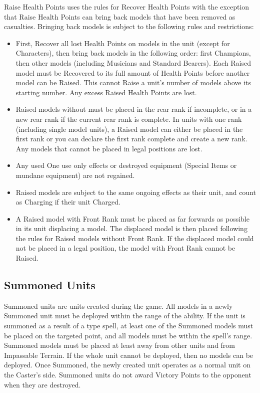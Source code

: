 Raise Health Points uses the rules for Recover Health Points with the exception that Raise Health Points can bring back models that have been removed as casualties. Bringing back models is subject to the following rules and restrictions:
\begin{itemize}
	\item First, Recover all lost Health Points on models in the unit (except for Characters), then bring back models in the following order: first Champions, then other \rnf{} models (including Musicians and Standard Bearers). Each Raised model must be Recovered to its full amount of Health Points before another model can be Raised. This cannot Raise a unit's number of models above its starting number. Any excess Raised Health Points are lost.
	\item Raised models without \frontrank{} must be placed in the rear rank if incomplete, or in a new rear rank if the current rear rank is complete. In units with one rank (including single model units), a Raised model can either be placed in the first rank or you can declare the first rank complete and create a new rank. Any models that cannot be placed in legal positions are lost.
	\item Any used One use only effects or destroyed equipment (Special Items or mundane equipment) are not regained.
	\item Raised models are subject to the same ongoing effects as their unit, and count as Charging if their unit Charged.
	\item A Raised model with Front Rank must be placed as far forwards as possible in its unit displacing a \rnf{} model. The displaced \rnf{} model is then placed following the rules for Raised models without Front Rank. If the displaced model could not be placed in a legal position, the model with Front Rank cannot be Raised.
\end{itemize}

\columnbreak

\subsection{Summoned Units}
\label{summoned_units}

Summoned units are units created during the game. All models in a newly Summoned unit must be deployed within the range of the ability. If the unit is summoned as a result of a \ground{} type spell, at least one of the Summoned models must be placed on the targeted point, and all models must be within the spell's range. Summoned models must be placed at least  away from other units and from Impassable Terrain. If the whole unit cannot be deployed, then no models can be deployed. Once Summoned, the newly created unit operates as a normal unit on the Caster's side. Summoned units do not award Victory Points to the opponent when they are destroyed.

\RBemc

